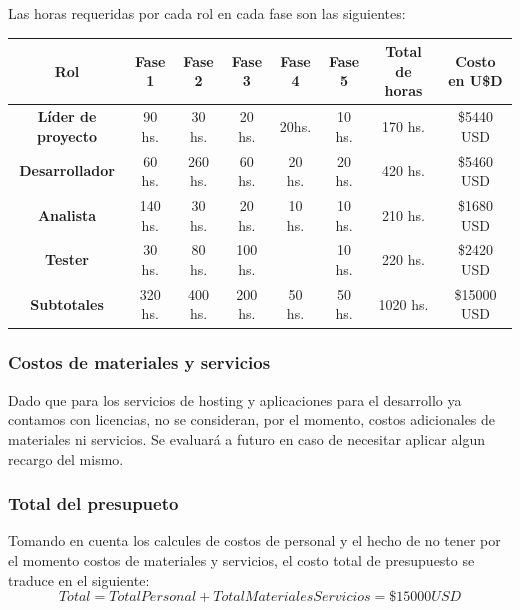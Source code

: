 \documentclass[a4paper,12pt]{article}
\begin{document}
    \par Las horas requeridas por cada rol en cada fase son las siguientes: \newline
    \begin{center}
        \begin{adjustbox}{width=1\textwidth}
            \begin{tabular}{ |c|c|c|c|c|c|c|c| }
                \hline
                \rowcolor{lightgray} \textbf{Rol} & \textbf{Fase 1} & \textbf{Fase 2} & \textbf{Fase 3} & \textbf{Fase 4} & \textbf{Fase 5} & \textbf{Total de horas} & \textbf{Costo en U\$D} \\
                \hline    
                \cellcolor{lightgray} \textbf{Líder de proyecto} & 90 hs. & 30 hs. & 20 hs. & 20hs. & 10 hs. & \cellcolor{lightgray} 170 hs. & \cellcolor{lightgray} \$5440 USD \\
                \hline
                \cellcolor{lightgray} \textbf{Desarrollador} & 60 hs. & 260 hs. & 60 hs. & 20 hs. & 20 hs. & \cellcolor{lightgray} 420 hs. & \cellcolor{lightgray} \$5460 USD \\
                \hline
                \cellcolor{lightgray} \textbf{Analista} & 140 hs. & 30 hs. & 20 hs. & 10 hs. & 10 hs. & \cellcolor{lightgray} 210 hs. & \cellcolor{lightgray} \$1680 USD \\
                \hline
                \cellcolor{lightgray} \textbf{Tester} & 30 hs. & 80 hs. & 100 hs. &  & 10 hs. & \cellcolor{lightgray} 220 hs. & \cellcolor{lightgray} \$2420 USD \\
                \hline
                \rowcolor{lightgray} \textbf{Subtotales} & 320 hs. & 400 hs. & 200 hs. & 50 hs. & 50 hs. & 1020 hs. & \$15000 USD \\
                \hline
            \end{tabular}
        \end{adjustbox}
    \end{center}
    \subsubsection{Costos de materiales y servicios}
    \par Dado que para los servicios de hosting y aplicaciones para el desarrollo ya contamos con licencias, no se consideran, por el momento, costos adicionales de materiales ni servicios. Se evaluará a futuro en caso de necesitar aplicar algun recargo del mismo.
    \subsubsection{Total del presupueto}
    \par Tomando en cuenta los calcules de costos de personal y el hecho de no tener por el momento costos de materiales y servicios, el costo total de presupuesto se traduce en el siguiente:
    \[ Total = Total Personal + Total Materiales Servicios = \$15000 USD \]
\end{document}
